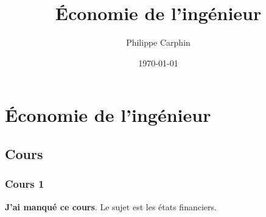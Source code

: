 \documentclass[11pt]{article}
\author{Philippe Carphin}
\date{\today}
\title{Économie de l'ingénieur}
\begin{document}
\maketitle
\tableofcontents


\section{Économie de l'ingénieur}
\label{sec:org2910b38}

\subsection{Cours}
\label{sec:org1e90c39}

\subsubsection{Cours 1}
\label{sec:orgfeb69f9}
\textbf{J'ai manqué ce cours}.
Le sujet est les états financiers.
\end{document}
